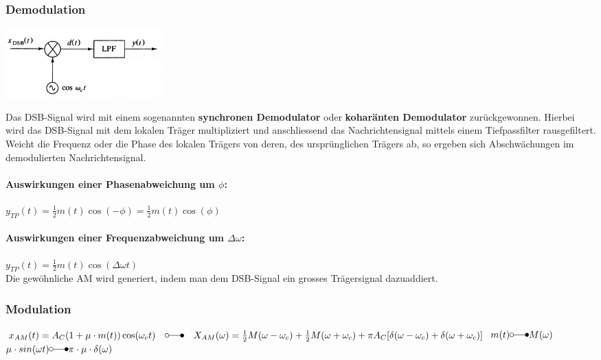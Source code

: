 \subsubsection{Demodulation} 
\label{am_dsb_modulation}
\begin{minipage}[t][2.3cm][c]{6.5cm}
    \includegraphics[width=6cm]{bilder/am_dsb_demodulation.png}
\end{minipage}
\begin{minipage}[t][2.3cm][c]{11.5cm}
	Das DSB-Signal wird mit einem sogenannten \textbf{synchronen Demodulator} oder \textbf{koharänten
	Demodulator} zurückgewonnen. Hierbei wird das DSB-Signal mit dem lokalen Träger
	multipliziert und anschliessend das Nachrichtensignal mittels einem Tiefpassfilter rausgefiltert.
	\\ Weicht die Frequenz oder die Phase des lokalen Trägers von deren, des ursprünglichen Trägers ab, 
	so ergeben sich Abschwächungen im demodulierten Nachrichtensignal.
\end{minipage}

\paragraph{Auswirkungen einer Phasenabweichung um $\phi$:} $y_{TP}(t) = \frac{1}{2}
m(t) \cos(-\phi)= \frac{1}{2} m(t) \cos(\phi) $
\paragraph{Auswirkungen einer Frequenzabweichung um $\Delta \omega$:} $y_{TP}(t) =
\frac{1}{2} m(t) \cos(\Delta \omega t)$\\



Die gewöhnliche AM wird generiert, indem man dem DSB-Signal ein grosses Trägersignal dazuaddiert.

\subsubsection{Modulation}

$x_{AM}(t) = A_C (1 + \mu \cdot m(t)) \cos(\omega_c t)
	\quad \laplace \quad X_{AM}(\omega) = \frac{1}{2}M(\omega - \omega_c) + \frac{1}{2}M(\omega + \omega_c) + \pi A_C [\delta (\omega - \omega_c) + \delta (\omega + \omega_c)]$
	$m(t) \laplace M(\omega)$ \\
	$\mu \cdot sin(\omega t) \laplace \pi \cdot \mu \cdot \delta(\omega)$


